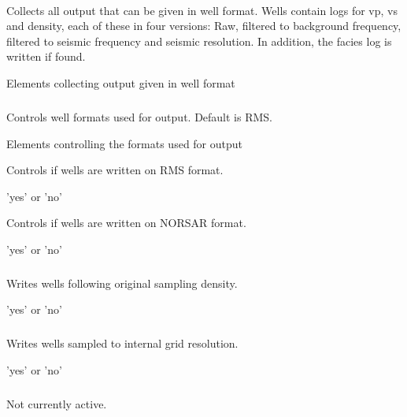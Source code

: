 \paragraph{}
 \slist
   \item \Description Collects all output that can be given in well format. Wells contain logs for vp, vs and density, each of these in four versions: Raw, filtered to background frequency, filtered to seismic frequency and seismic resolution. In addition, the facies log is written if found.
   \item \Argument Elements collecting output given in well format
   \item \Default
 \elist

\subparagraph{}
 \slist
   \item \Description Controls well formats used for output. Default is RMS.
   \item \Argument Elements controlling the formats used for output
   \item \Default
 \elist

 \slist
   \item \Description Controls if wells are written on RMS format.
   \item \Argument 'yes' or 'no'
   \item \Default
 \elist

 \slist
   \item \Description Controls if wells are written on NORSAR format.
   \item \Argument 'yes' or 'no'
   \item \Default
 \elist

\subparagraph{}
 \slist
   \item \Description Writes wells following original sampling density.
   \item \Argument 'yes' or 'no'
   \item \Default
 \elist

\subparagraph{}
 \slist
   \item \Description Writes wells sampled to internal grid resolution.
   \item \Argument 'yes' or 'no'
   \item \Default
 \elist

\subparagraph{}
 \slist
   \item \Description Not currently active.
   \item \Argument
   \item \Default
 \elist

